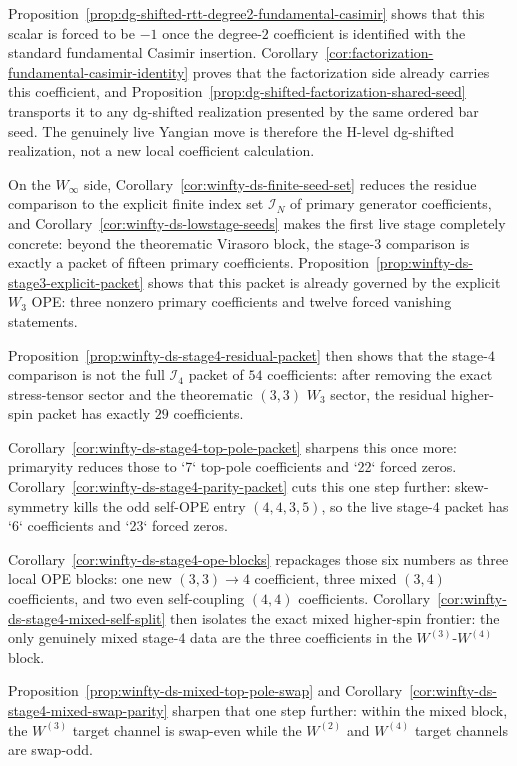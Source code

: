 \begin{remark}
\begin{remark}
Proposition~\ref{prop:dg-shifted-rtt-degree2-fundamental-casimir}
shows that this scalar is forced to be $-1$ once the degree-$2$
coefficient is identified with the standard fundamental Casimir
insertion.  Corollary~\ref{cor:factorization-fundamental-casimir-identity}
proves that the factorization side already carries this coefficient,
and Proposition~\ref{prop:dg-shifted-factorization-shared-seed}
transports it to any dg-shifted realization presented by the same
ordered bar seed.  The genuinely live Yangian move is therefore the
H-level dg-shifted realization, not a new local coefficient
calculation.
\end{remark}

On the $W_\infty$ side,
Corollary~\ref{cor:winfty-ds-finite-seed-set} reduces the residue
comparison to the explicit finite index set $\mathcal{I}_N$ of primary
generator coefficients, and
Corollary~\ref{cor:winfty-ds-lowstage-seeds} makes the first live stage
completely concrete: beyond the theorematic Virasoro block, the
stage-$3$ comparison is exactly a packet of fifteen primary
coefficients.  Proposition~\ref{prop:winfty-ds-stage3-explicit-packet}
shows that this packet is already governed by the explicit $W_3$ OPE:
three nonzero primary coefficients and twelve forced vanishing
statements.

Proposition~\ref{prop:winfty-ds-stage4-residual-packet}
then shows that the stage-$4$ comparison is not the full
$\mathcal{I}_4$ packet of $54$ coefficients: after removing the exact
stress-tensor sector and the theorematic $(3,3)$ $W_3$ sector, the
residual higher-spin packet has exactly $29$ coefficients.

Corollary~\ref{cor:winfty-ds-stage4-top-pole-packet} sharpens this
once more: primaryity reduces those to `7` top-pole coefficients and
`22` forced zeros.  Corollary~\ref{cor:winfty-ds-stage4-parity-packet}
cuts this one step further: skew-symmetry kills the odd self-OPE entry
$(4,4,3,5)$, so the live stage-$4$ packet has `6` coefficients and
`23` forced zeros.

Corollary~\ref{cor:winfty-ds-stage4-ope-blocks} repackages those six
numbers as three local OPE blocks: one new $(3,3)\to 4$ coefficient,
three mixed $(3,4)$ coefficients, and two even self-coupling $(4,4)$
coefficients.  Corollary~\ref{cor:winfty-ds-stage4-mixed-self-split}
then isolates the exact mixed higher-spin frontier: the only genuinely
mixed stage-$4$ data are the three coefficients in the
$W^{(3)}$-$W^{(4)}$ block.

Proposition~\ref{prop:winfty-ds-mixed-top-pole-swap} and
Corollary~\ref{cor:winfty-ds-stage4-mixed-swap-parity} sharpen that one
step further: within the mixed block, the $W^{(3)}$ target channel is
swap-even while the $W^{(2)}$ and $W^{(4)}$ target channels are
swap-odd.


\end{remark}
